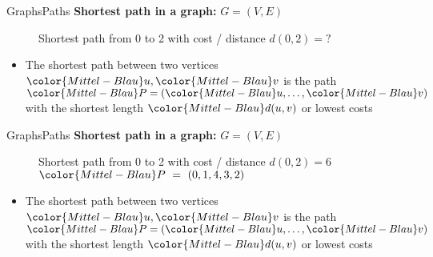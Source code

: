 \begin{frame}{Graphs}{Paths}
  \textbf{Shortest path in a graph:}
         {\color{Mittel-Blau}$G = (V , E)$}
  \begin{figure}
    \begin{adjustbox}{width=0.75\linewidth}
      
    \end{adjustbox}
    \caption{{\color{Mittel-Blau}Shortest path} from 0 to 2 with cost / distance
      {\color{Mittel-Blau}$d(0,2) = ?$}
     }
    \label{fig:graphs:shortest_path}
  \end{figure}
  \begin{itemize}
    \item<3->
      The {\color{Mittel-Blau}shortest path} between two vertices
      ${\color{Mittel-Blau}u}, {\color{Mittel-Blau}v}$ is the path
      \begin{math}
        {\color{Mittel-Blau}P}
          = ({\color{Mittel-Blau}u}, \dots, {\color{Mittel-Blau}v})
      \end{math}
      with the shortest length ${\color{Mittel-Blau}d(u,v)}$ or lowest costs
  \end{itemize}
\end{frame}

\begin{frame}{Graphs}{Paths}
  \textbf{Shortest path in a graph:}
         {\color{Mittel-Blau}$G = (V , E)$}
  \begin{figure}
    \begin{adjustbox}{width=0.75\linewidth}
      
    \end{adjustbox}
    \caption{{\color{Mittel-Blau}Shortest path} from 0 to 2 with cost / distance
      {\color{Mittel-Blau}$d(0,2) = 6$}
      ${\color{Mittel-Blau}P}~=~(0, 1, 4, 3, 2)$}
    \label{fig:graphs:shortest_path}
  \end{figure}
  \begin{itemize}
    \item
      The {\color{Mittel-Blau}shortest path} between two vertices
      ${\color{Mittel-Blau}u}, {\color{Mittel-Blau}v}$ is the path
      \begin{math}
        {\color{Mittel-Blau}P}
          = ({\color{Mittel-Blau}u}, \dots, {\color{Mittel-Blau}v})
      \end{math}
      with the shortest length ${\color{Mittel-Blau}d(u,v)}$ or lowest costs
  \end{itemize}
\end{frame}

